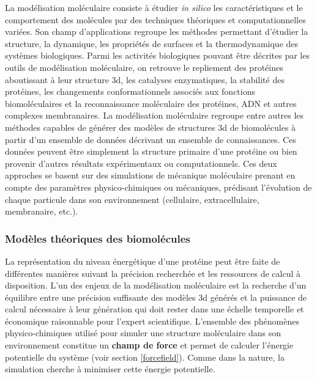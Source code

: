 La modélisation moléculaire consiste à étudier \textit{in silico} les caractéristiques et le comportement des molécules par des techniques théoriques et computationnelles variées. Son champ d'applications regroupe les méthodes permettant d'étudier la structure, la dynamique, les propriétés de surfaces et la thermodynamique des systèmes biologiques. Parmi les activités biologiques pouvant être décrites par les outils de modélisation moléculaire, on retrouve le repliement des protéines aboutissant à leur structure 3d, les catalyses enzymatiques, la stabilité des protéines, les changements conformationnels associés aux fonctions biomoléculaires et la reconnaissance moléculaire des protéines, ADN et autres complexes membranaires.
La modélisation moléculaire regroupe entre autres les méthodes capables de générer des modèles de structures 3d de biomolécules à partir d'un ensemble de données décrivant un ensemble de connaissances. Ces données peuvent être simplement la structure primaire d'une protéine ou bien provenir d'autres résultats expérimentaux ou computationnels. Ces deux approches se basent sur des simulations de mécanique moléculaire prenant en compte des paramètres physico-chimiques ou mécaniques, prédisant l'évolution de chaque particule dans son environnement (cellulaire, extracellulaire, membranaire, etc.). 


\subsubsection{Modèles théoriques des biomolécules}

La représentation du niveau énergétique d'une protéine peut être faite de différentes manières suivant la précision recherchée et les ressources de calcul à disposition. L'un des enjeux de la modélisation moléculaire est la recherche d'un équilibre entre une précision suffisante des modèles 3d générés et la puissance de calcul nécessaire à leur génération qui doit rester dans une échelle temporelle et économique raisonnable pour l'expert scientifique.
L'ensemble des phénomènes physico-chimiques utilisé pour simuler une structure moléculaire dans son environnement constitue un \textbf{champ de force} et permet de calculer l'énergie potentielle du système (voir section \ref{forcefield}). Comme dans la nature, la simulation cherche à minimiser cette énergie potentielle.

 \label{quantic}

